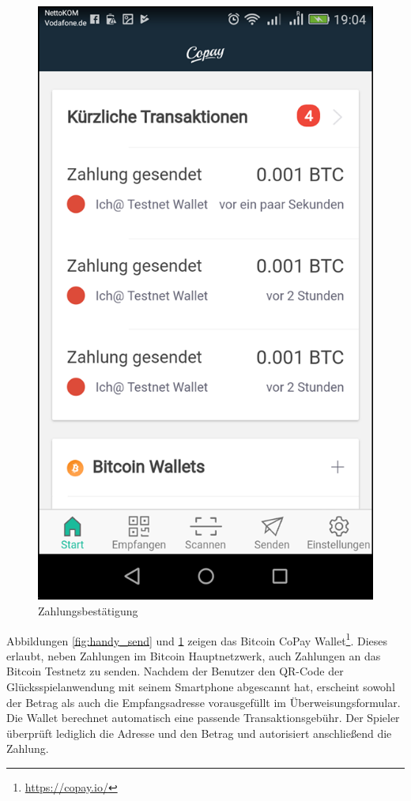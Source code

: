 \begin{minipage}{0.48\textwidth}
\begin{figure}[H]
\centering
\includegraphics[width=1\linewidth]{Figures/btc_gui/handy_confirm}
\decoRule
\caption{Zahlungsbestätigung}
\label{fig:handy_confirm}
\end{figure}
\end{minipage}

Abbildungen \ref{fig:handy_send} und \ref{fig:handy_confirm} zeigen das Bitcoin CoPay Wallet\footnote{\url{https://copay.io/}}. Dieses erlaubt, neben Zahlungen im Bitcoin Hauptnetzwerk, auch Zahlungen an das Bitcoin Testnetz zu senden. Nachdem der Benutzer den QR-Code der Glücksspielanwendung mit seinem Smartphone abgescannt hat, erscheint sowohl der Betrag als auch die Empfangsadresse vorausgefüllt im Überweisungsformular. Die Wallet berechnet automatisch eine passende Transaktionsgebühr. Der Spieler überprüft lediglich die Adresse und den Betrag und  autorisiert anschließend die Zahlung.

